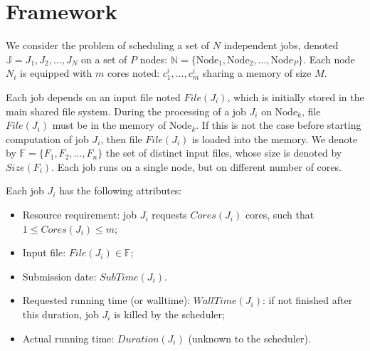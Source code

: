 \documentclass[conference,10pt]{IEEEtran}
\newcommand{\Node}[1]{\ensuremath{\mathrm{Node}_{#1}}\xspace}
\newcommand{\file}{\ensuremath{\mathit{File}}\xspace}
\newcommand{\size}{\ensuremath{\mathit{Size}}\xspace}
\newcommand{\duration}{\mathit{Duration}\xspace}
\newcommand{\core}{\mathit{Cores}\xspace}
\newcommand{\submissiontime}{\mathit{SubTime}\xspace}
\newcommand{\walltime}{\mathit{WallTime}\xspace}
\newcommand{\fileset}{\ensuremath{\mathbb{F}}\xspace}
\newcommand{\jobset}{\ensuremath{\mathbb{J}}\xspace}
\newcommand{\nodeset}{\ensuremath{\mathbb{N}}\xspace}
\begin{document}


\section{Framework}\label{sec.framework}

We consider the problem of scheduling a set of $N$ independent jobs,
denoted $\jobset = {J_1, J_2, \ldots, J_N}$ on a set of $P$ nodes:
$\nodeset = \{\Node{1}, \Node{2}, \ldots, \Node{P}\}$.
Each node $N_i$ is equipped with $m$ cores noted:
$c^i_1,\ldots,c^i_m$ sharing a memory of size $M$.

Each job depends on an input file noted $\file(J_i)$, which is
initially stored in the main shared file system.  During the
processing of a job $J_i$ on $\Node{k}$, file $\file(J_i)$ must be in
the memory of $\Node{k}$. If this is not the case before starting
computation of job $J_i$, then file $\file(J_i)$ is loaded into the
memory.  We denote by $\fileset = \{F_1, F_2, \ldots, F_n\}$ the set
of distinct input files, whose size is denoted by $\size(F_i)$. Each
job runs on a single node, but on different number of cores.



Each job $J_i$ has the following attributes:
\begin{itemize}
\item Resource requirement: job $J_i$ requests $\core(J_i)$  cores, such that $1 \leq \core(J_i) \leq m$;
\item Input file: $\file(J_i) \in \fileset$;
\item Submission date: $\submissiontime(J_i)$.
\item Requested running time (or walltime): $\walltime(J_i)$: if not
  finished after this duration, job $J_i$ is killed by the scheduler;
\item Actual running time: $\duration(J_i)$ (unknown to  the scheduler).
\end{itemize}
\end{document}
